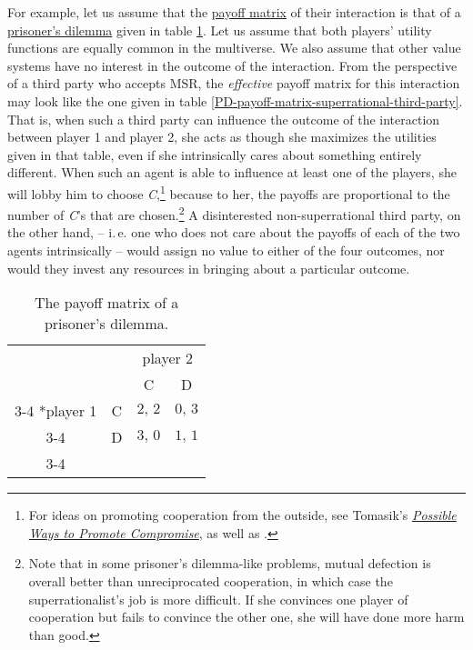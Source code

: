 For example, let us assume that the
\href{https://en.wikipedia.org/wiki/Normal-form_game}{payoff
matrix} of their interaction is that of a
\href{https://en.wikipedia.org/wiki/Prisoner\%27s_dilemma}{prisoner's
dilemma} given in table \ref{PD-payoff-matrix}. Let us
assume that both players' utility functions are equally common in the
multiverse. We also assume that other value systems have no interest in
the outcome of the interaction. From the perspective of a third party
who accepts MSR, the \emph{effective} payoff matrix for this interaction
may look like the one given in table
\ref{PD-payoff-matrix-superrational-third-party}. That
is, when such a third party can influence the outcome of the interaction
between player 1 and player 2, she acts as though she maximizes the
utilities given in that table, even if she intrinsically cares about
something entirely different. When such an agent is able to influence at
least one of the players, she will lobby him to choose
\emph{C},\footnote{For ideas on promoting cooperation from the outside,
  see Tomasik's
  \href{https://foundational-research.org/possible-ways-to-promote-compromise/}{\emph{Possible
  Ways to Promote Compromise}}, as well as \citet[chapter 7]{Axelrod2006-ci}.} because to her, the payoffs
are proportional to the number of \emph{C}'s that are chosen.\footnote{Note
  that in some prisoner's dilemma-like problems, mutual defection is
  overall better than unreciprocated cooperation, in which case the
  superrationalist's job is more difficult. If she convinces one player
  of cooperation but fails to convince the other one, she will have done
  more harm than good.} A disinterested non-superrational third party,
on the other hand, -- i.\,e. one who does not care about the payoffs of
each of the two agents intrinsically -- would assign no value to either
of the four outcomes, nor would they invest any resources in bringing
about a particular outcome.

\renewcommand{\arraystretch}{1.5}
\begin{table}[h!]
    \centering
    \setlength{\extrarowheight}{2pt}
    \begin{tabular}{cc|c|c|}
      & \multicolumn{1}{c}{} & \multicolumn{2}{c}{player 2}\\
      & \multicolumn{1}{c}{} & \multicolumn{1}{c}{C}  & \multicolumn{1}{c}{D} \\\cline{3-4}
      \multirow{2}*{player 1}  & C & $2,\, 2$ & $0,\, 3$ \\\cline{3-4}
      & D & $3,\, 0$ & $1,\, 1$ \\\cline{3-4}
    \end{tabular}
    \caption{The payoff matrix of a prisoner's dilemma.}
    \label{PD-payoff-matrix}
\end{table}

